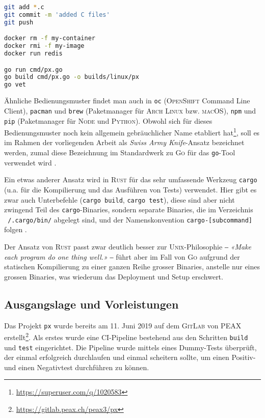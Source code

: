 \begin{lstlisting}[language=bash,caption={Einie Kommandozeilenbeispiele mit Haupt- und Unterbefehl}]
git add *.c
git commit -m 'added C files'
git push

docker rm -f my-container
docker rmi -f my-image
docker run redis

go run cmd/px.go
go build cmd/px.go -o builds/linux/px
go vet
\end{lstlisting}

Ähnliche Bedienungsmuster findet man auch in \texttt{oc} (\textsc{OpenShift} Command Line Client), \texttt{pacman} und \texttt{brew} (Paketmanager für \textsc{Arch Linux} bzw. \textsc{macOS}), \texttt{npm} und \texttt{pip} (Paketmanager für \textsc{Node} und \textsc{Python}). Obwohl sich für dieses Bedienungsmuster noch kein allgemein gebräuchlicher Name etabliert hat\footnote{\url{https://superuser.com/q/1020583}}, soll es im Rahmen der vorliegenden Arbeit als \textit{Swiss Army Knife}-Ansatz bezeichnet werden, zumal diese Bezeichnung im Standardwerk zu \textsc{Go} für das \texttt{go}-Tool verwendet wird \cite{gopl}.

Ein etwas anderer Ansatz wird in \textsc{Rust} für das sehr umfassende Werkzeug \texttt{cargo} (u.a. für die Kompilierung und das Ausführen von Tests) verwendet. Hier gibt es zwar auch Unterbefehle (\texttt{cargo build}, \texttt{cargo test}), diese sind aber nicht zwingend Teil des \texttt{cargo}-Binaries, sondern separate Binaries, die im Verzeichnis \texttt{~/.cargo/bin/} abgelegt sind, und der Namenskonvention \texttt{cargo-[subcommand]} folgen \cite[Kapitel 14.5]{rust-book}.

Der Ansatz von \textsc{Rust} passt zwar deutlich besser zur \textsc{Unix}-Philosophie ‒ \textit{«Make each program do one thing well.»} \cite[p. 3]{unixtimesharing} ‒ führt aber im Fall von \textsc{Go} aufgrund der statischen Kompilierung zu einer ganzen Reihe grosser Binaries, anstelle nur eines grossen Binaries, was wiederum das Deployment und Setup erschwert.

\subsection{Ausgangslage und Vorleistungen}

Das Projekt \texttt{px} wurde bereits am 11. Juni 2019 auf dem \textsc{GitLab} von PEAX erstellt\footnote{\url{https://gitlab.peax.ch/peax3/px}}. Als erstes wurde eine CI-Pipeline bestehend aus den Schritten \texttt{build} und \texttt{test} eingerichtet. Die Pipeline wurde mittels eines Dummy-Tests überprüft, der einmal erfolgreich durchlaufen und einmal scheitern sollte, um einen Positiv- und einen Negativtest durchführen zu können.

